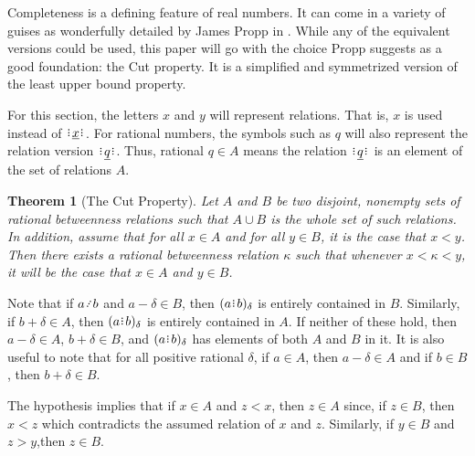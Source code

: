 \documentclass[12pt]{article}
\newtheorem{theorem}{Theorem}[section]
\begin{document}
Completeness is a defining feature of real numbers. It can come in a variety of guises as wonderfully detailed by James Propp in \cite{propp}. While any of the equivalent versions could be used, this paper will go with the choice Propp suggests as a good foundation:  the Cut property. It is a simplified and symmetrized version of the least upper bound property. 

For this section, the letters $x$ and $y$ will represent relations. That is, $x$ is used instead of $\xrel$. For rational numbers, the symbols such as $q$ will also represent the relation version $\xrel[q]$. Thus, rational $q \in A$ means the relation $\xrel[q]$ is an element of the set of relations $A$. 

\begin{theorem}[The Cut Property] 
Let $A$ and $B$ be two disjoint, nonempty sets of rational betweenness relations such that $A \cup B$ is the whole set of such relations. In addition, assume that for all $x \in A$ and for all $y \in B$, it is the case that $x < y$. Then there exists a rational betweenness relation $\kappa$ such that whenever $x < \kappa < y$, it will be the case that $ x \in A$ and $y \in B$.
\end{theorem}

Note that if $a \lte b$ and $a-\delta \in B$, then $\halo{a\rint b}$ is entirely contained in $B$. Similarly, if $b + \delta \in A$, then $\halo{a\rint b}$ is entirely contained in $A$. If neither of these hold, then $a-\delta \in A$, $b+\delta \in B$, and $\halo{a\rint b}$ has elements of both $A$ and $B$ in it. It is also useful to note that for all positive rational $\delta$, if $a \in A$, then $a-\delta \in A$ and if $b \in B$, then $b+\delta \in B$.

The hypothesis implies that if $x \in A$ and $z < x$, then $z \in A$ since, if $z \in B$, then $x < z$ which contradicts the assumed relation of $x$ and $z$. Similarly, if $y \in B$ and $z > y$,then $z \in B$. 
\end{document}
